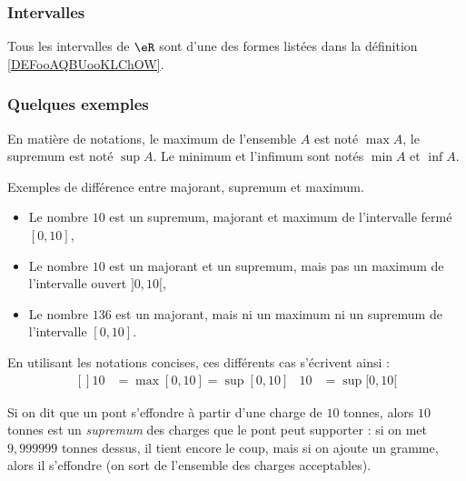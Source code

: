 \subsubsection{Intervalles}

\begin{proposition}     \label{PROPooHPMWooQJXCAS}
    Tous les intervalles de \( \eR\) sont d'une des formes listées dans la définition \ref{DEFooAQBUooKLChOW}.
\end{proposition}

\subsubsection{Quelques exemples}

En matière de notations, le maximum de l'ensemble $A$ est noté $\max A$, le supremum est noté $\sup A$. Le minimum et l'infimum sont notés $\min A$ et $\inf A$.

\begin{example}
Exemples de différence entre majorant, supremum et maximum.
\begin{itemize}
\item Le nombre $10$ est un supremum, majorant et maximum de l'intervalle fermé $[0,10]$,
\item Le nombre $10$ est un majorant et un supremum, mais pas un maximum de l'intervalle ouvert $]0,10[$,
\item Le nombre $136$ est un majorant, mais ni un maximum ni un supremum de l'intervalle $[0,10]$.
\end{itemize}
\end{example}

En utilisant les notations concises, ces différents cas s'écrivent ainsi :
\begin{equation}
    \begin{aligned}[]
10&=\max[0,10]=\sup[0,10]	& 10&=\sup[0,10[
    \end{aligned}
\end{equation}


\begin{example}
Si on dit que un pont s'effondre à partir d'une charge de $10$ tonnes, alors $10$ tonnes est un \emph{supremum} des charges que le pont peut supporter : si on met $9,999999$ tonnes dessus, il tient encore le coup, mais si on ajoute un gramme, alors il s'effondre (on sort de l'ensemble des charges acceptables).
\end{example}


